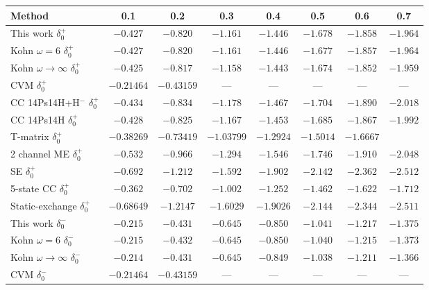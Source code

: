 \documentclass[Dissertation.tex]{subfiles}
\begin{document}
\begin{table}[H]
\centering
\footnotesize
\begin{tabular}{l c c c c c c c}
\toprule
Method & 0.1 & 0.2 & 0.3 & 0.4 & 0.5 & 0.6 & 0.7 \\
\midrule
This work $\delta_0^+$ & $-0.427$ & $-0.820$ & $-1.161$ & $-1.446$ & $-1.678$ & $-1.858$ & $-1.964$ \\
Kohn $\omega = 6$ \cite{VanReeth2003} $\delta_0^+$ & $-0.427$ & $-0.820$ & $-1.161$ & $-1.446$ & $-1.677$ & $-1.857$ & $-1.964$ \\
Kohn $\omega \rightarrow \infty$ \cite{VanReeth2003} $\delta_0^+$ & $-0.425$ & $-0.817$ & $-1.158$ & $-1.443$ & $-1.674$ & $-1.852$ & $-1.959$ \\
CVM \cite{Zhang2012} $\delta_0^+$ & $-0.21464$ & $-0.43159$ &    ---     &    ---     &    ---     &    ---     &    ---    \\
CC 14Ps14H+H$^-$ \cite{Walters2004} $\delta_0^+$ & $-0.434$ & $-0.834$ & $-1.178$ & $-1.467$ & $-1.704$ & $-1.890$ & $-2.018$ \\
CC 14Ps14H \cite{Blackwood2002} $\delta_0^+$ & $-0.428$ & $-0.825$ & $-1.167$ & $-1.453$ & $-1.685$ & $-1.867$ & $-1.992$ \\
T-matrix \cite{Biswas2002a} $\delta_0^+$ & $-0.38269$ & $-0.73419$ & $-1.03799$ & $-1.2924$ & $-1.5014$ & $-1.6667$ \\
2 channel ME \cite{Biswas2001} $\delta_0^+$ & $-0.532$ & $-0.966$ & $-1.294$ & $-1.546$ & $-1.746$ & $-1.910$ & $-2.048$ \\
SE \cite{Ray1997} $\delta_0^+$ & $-0.692$ & $-1.212$ & $-1.592$ & $-1.902$ & $-2.142$ & $-2.362$ & $-2.512$ \\
5-state CC \cite{Adhikari1999} $\delta_0^+$ & $-0.362$ & $-0.702$ & $-1.002$ & $-1.252$ & $-1.462$ & $-1.622$ & $-1.712$ \\
Static-exchange \cite{Hara1975} $\delta_0^+$ & $-0.68649$ & $-1.2147$ & $-1.6029$ & $-1.9026$ & $-2.144$ & $-2.344$ & $-2.511$ \\
\midrule
This work $\delta_0^-$ & $-0.215$ & $-0.431$ & $-0.645$ & $-0.850$ & $-1.041$ & $-1.217$ & $-1.375$ \\
Kohn $\omega = 6$ \cite{VanReeth2003} $\delta_0^-$ & $-0.215$ & $-0.432$ & $-0.645$ & $-0.850$ & $-1.040$ & $-1.215$ & $-1.373$ \\
Kohn $\omega \rightarrow \infty$ \cite{VanReeth2003} $\delta_0^-$ & $-0.214$ & $-0.431$ & $-0.645$ & $-0.849$ & $-1.038$ & $-1.211$ & $-1.366$ \\
CVM \cite{Zhang2012} $\delta_0^-$ & $-0.21464$ & $-0.43159$ & --- & --- &  --- &  --- &  --- \\

\end{tabular}
\end{table}
\end{document}
